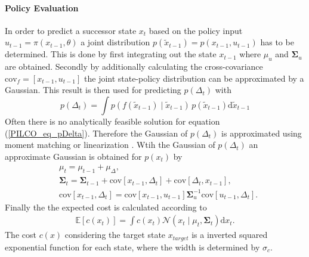 \documentclass[letterpaper, 10 pt, conference]{ieeeconf}  %
\begin{document}
\paragraph{Policy Evaluation}
In order to predict a successor state $x_t$ based on the policy input $u_{t-1} = \pi\left(x_{t-1},\theta\right)$ a joint distribution $p\left(\tilde{x}_{t-1}\right) = p\left(x_{t-1},u_{t-1}\right)$ has to be determined. This is done by first integrating out the state $x_{t-1}$ where $\mu_u$ and $\mathbf{\Sigma}_u$ are obtained. Secondly by additionally calculating the cross-covariance $\text{cov}_f = \left[{x}_{t-1},u_{t-1}\right]$ the joint state-policy distribution can be approximated by a Gaussian. This result is then used for predicting $p\left(\Delta_t\right)$ with
\begin{equation}\label{PILCO_eq_pDelta}
p\left(\Delta_t\right) = \int p\left(f(\tilde{x}_{t-1})\mid\tilde{x}_{t-1}\right)\, p\left(\tilde{x}_{t-1}\right) \text{d}\tilde{x}_{t-1}
\end{equation}
Often there is no analytically feasible solution for equation (\ref{PILCO_eq_pDelta}). Therefore the Gaussian of $p\left(\Delta_t\right)$ is approximated using moment matching or linearization \cite{GP_deisenroth}. Wtih the Gaussian of $p\left(\Delta_t\right)$ an approximate Gaussian is obtained for $p\left(x_t\right)$ by
\begin{align}
&\mu_t = \mu_{t-1}+\mu_\Delta, \\
&\mathbf{\Sigma}_t = \mathbf{\Sigma}_{t-1} +\text{cov}\left[x_{t-1},\Delta_{t}\right]+\text{cov}\left[\Delta_t,x_{t-1}\right],\\
&\text{cov}\left[x_{t-1},\Delta_{t}\right] = \text{cov}\left[x_{t-1},u_{t-1}\right]\mathbf{\Sigma}_u^{-1}\text{cov}\left[u_{t-1},\Delta_{t}\right].
\end{align}
Finally the the expected cost is calculated according to 
\begin{align}
\mathbb{E}\left[c\left(x_t\right)\right] = \int c\left(x_t\right) \mathcal{N}\left(x_t\mid\mu_t,\mathbf{\Sigma}_t\right) \text{d}x_t.
\end{align}
The cost $c(x)$ considering the target state $x_{target}$ is a inverted squared exponential function for each state,
where the width is determined by $\sigma_c$.
\end{document}
